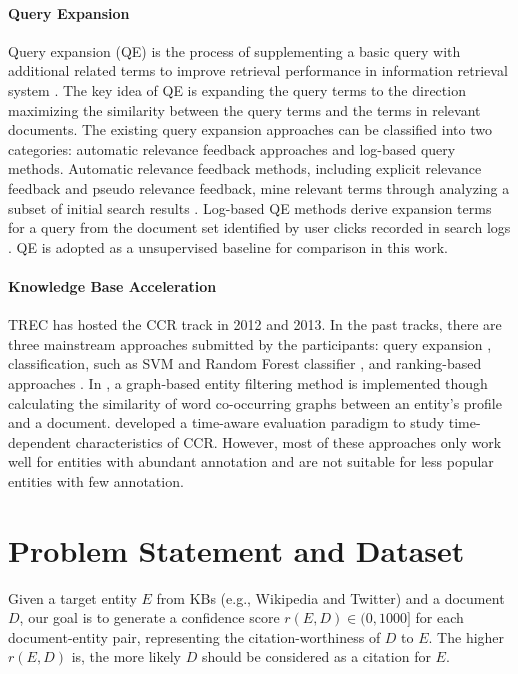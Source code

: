 \documentclass{sig-alternate}
\begin{document}
\paragraph{Query Expansion}
Query expansion (QE) is the process of supplementing a basic query with additional related terms to improve retrieval performance in information retrieval system \cite{Carpineto:2012:SAQ:2071389.2071390}. The key idea of QE is expanding the query terms to the direction maximizing the similarity between the query terms and the terms in relevant documents. The existing query expansion approaches can be classified into two categories: automatic relevance feedback approaches and log-based query methods. Automatic relevance feedback methods, including explicit relevance feedback and pseudo relevance feedback, mine relevant terms through analyzing a subset of initial search results \cite{Bendersky:2012:EQF:2124295.2124349, Collins-Thompson:2005:QEU:1099554.1099727}. Log-based QE methods derive expansion terms for a query from the document set identified by user clicks recorded in search logs \cite{Cui:2003:QEM:1435677.858986,Broder:2009:OER:1526709.1526778,Gao:2013:QEU:2484028.2484058}. QE is adopted as a unsupervised baseline for comparison in this work.

\paragraph{Knowledge Base Acceleration}
TREC has hosted the CCR track in 2012 and 2013. In the past tracks, there are three mainstream approaches submitted by the participants: query expansion \cite{Liu:2013:LRE:2512405.2512407, wang2013bit}, classification, such as SVM \cite{HLTCOE2012KBA} and Random Forest classifier \cite{UVA2012KBA, Bonnefoy:2013:WDE:2484028.2484180, Balog:2013:MCA:2491748.2491775}, and ranking-based approaches \cite{PRIS2012KBA, Balog:2013:CCR:2484028.2484151}. In \cite{grossnamed}, a graph-based entity filtering method is implemented though calculating the similarity of word co-occurring graphs between an entity's profile and a document. \cite{Dietz:2013:TEC} developed a time-aware evaluation paradigm to study time-dependent characteristics of CCR. However, most of these approaches only work well for entities with abundant annotation and are not suitable for less popular entities with few annotation.

\section{Problem Statement and Dataset}\label{sec:problem-statement}
Given a target entity $E$ from KBs (e.g., Wikipedia and Twitter) and a document $D$, our goal is to generate a confidence score $r(E, D) \in (0,1000]$ for each document-entity pair, representing the citation-worthiness of $D$ to $E$. The higher $r(E, D)$ is, the more likely $D$ should be considered as a citation for $E$.
\end{document}
